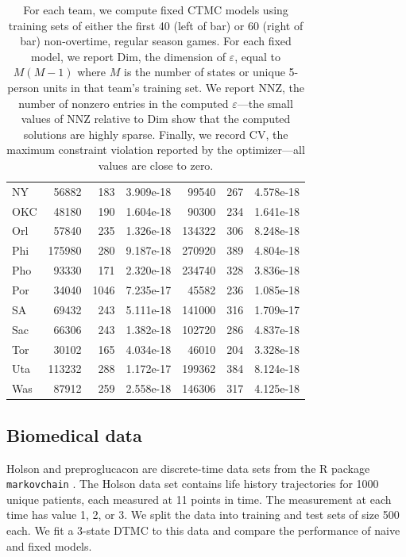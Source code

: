 \documentclass[review,letterpaper,11pt]{elsarticle}
\begin{document}
\begin{table}[tbh]
\begin{tabular}{lrrr|rrr}
NY   &    56882 &        183 &  3.909e-18 & 99540 &        267 &  4.578e-18 \\
OKC  &    48180 &        190 &  1.604e-18 & 90300 &        234 &  1.641e-18 \\
Orl  &    57840 &        235 &  1.326e-18 & 134322 &        306 &  8.248e-18 \\
Phi  &   175980 &        280 &  9.187e-18 & 270920 &        389 &  4.804e-18 \\
Pho  &    93330 &        171 &  2.320e-18 & 234740 &        328 &  3.836e-18 \\
Por  &    34040 &       1046 &  7.235e-17 & 45582 &        236 &  1.085e-18 \\
SA   &    69432 &        243 &  5.111e-18 & 141000 &        316 &  1.709e-17 \\
Sac  &    66306 &        243 &  1.382e-18 & 102720 &        286 &  4.837e-18 \\
Tor  &    30102 &        165 &  4.034e-18 & 46010 &        204 &  3.328e-18 \\
Uta  &   113232 &        288 &  1.172e-17 & 199362 &        384 &  8.124e-18 \\
Was  &    87912 &        259 &  2.558e-18 & 146306 &        317 &  4.125e-18 \\
\bottomrule
\end{tabular}
\caption{ For each team, we compute fixed CTMC models using training sets of either the first 40 (left of bar) or 60 (right of bar) non-overtime, regular season games.  For each fixed model, we report Dim, the dimension of $\varepsilon$, equal to $M(M-1)$ where $M$ is the number of states or unique 5-person units in that team's training set.  We report NNZ, the number of nonzero entries in the computed $\varepsilon$---the small values of NNZ relative to Dim show that the computed solutions are highly sparse.  Finally, we record CV, the maximum constraint violation reported by the optimizer---all values are close to zero.}
\label{tab:sparse40}
\end{table}

\subsection{Biomedical data}
Holson and preproglucacon are discrete-time data sets from the R package \verb+markovchain+ \cite{markovchain}. The Holson data set contains life history trajectories for 1000 unique patients, each measured at 11 points in time.  The measurement at each time has value 1, 2, or 3.  We split the data into training and test sets of size 500 each.  We fit a 3-state DTMC to this data and compare the performance of naive and fixed models.
\end{document}
